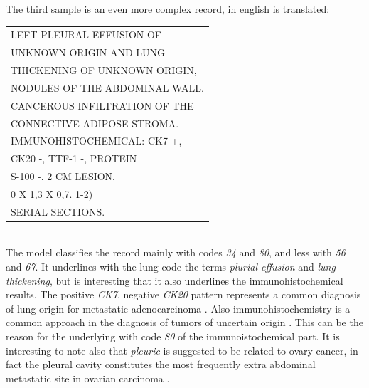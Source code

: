 The third sample is an even more complex record, in english is
translated:\\
\begin{small}
  \ttfamily
  \begin{tabular}{l}
    LEFT PLEURAL EFFUSION OF\\
    UNKNOWN ORIGIN AND LUNG\\
    THICKENING OF UNKNOWN ORIGIN,\\
    NODULES OF THE ABDOMINAL WALL.\\
    CANCEROUS INFILTRATION OF THE\\
    CONNECTIVE-ADIPOSE STROMA.\\
    IMMUNOHISTOCHEMICAL: CK7 +,\\
    CK20 -, TTF-1 -, PROTEIN\\
    S-100 -. 2 CM LESION,\\
    0 X 1,3 X 0,7. 1-2)\\
    SERIAL SECTIONS.
\end{tabular}
\end{small}\\
The model classifies the record mainly with codes \emph{34} and
\emph{80}, and less with \emph{56} and \emph{67}. It underlines with
the lung code the terms
\emph{plurial effusion} and \emph{lung thickening}, but is interesting
that it also underlines the immunohistochemical results. The
positive \emph{CK7}, negative \emph{CK20} pattern represents a common
diagnosis 
of lung origin for metastatic adenocarcinoma
\cite{kummar2002cytokeratin}. Also immunohistochemistry is a common
approach in the diagnosis of tumors of uncertain origin
\cite{duraiyan2012applications}. This can be the reason for the
underlying with code \emph{80} of the immunoistochemical part.
It is interesting to note also that \emph{pleuric} is
suggested to be related to ovary cancer, in fact the pleural cavity
constitutes the most frequently extra abdominal metastatic site in
ovarian carcinoma \cite{porcel2012pleural}.

